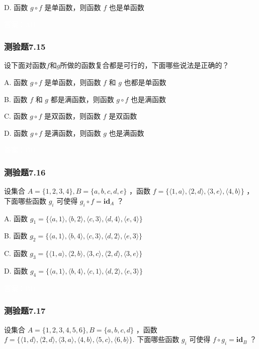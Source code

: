 \documentclass[UTF8, heading=true]{ctexart}
\begin{document}
D.  函数 $g \circ f$ 是单函数，则函数 $f$ 也是单函数

\textcolor{white}{答案：AD}

\subsubsection{测验题7.15}

设下面对函数$f$和$g$所做的函数复合都是可行的，下面哪些说法是正确的？

A. 函数 $g \circ f$ 是单函数，则函数 $f$ 和 $g$ 也都是单函数

B. 函数 $f$ 和 $g$ 都是满函数，则函数 $g \circ f$ 也是满函数

C. 函数 $g \circ f$ 是双函数，则函数 $f$ 是双函数

D. 函数 $g \circ f$ 是满函数，则函数 $g$ 也是满函数

\textcolor{white}{答案：BD}

\subsubsection{测验题7.16}

设集合 $A=\{1,2,3,4\}, B=\{a, b, c, d, e\}$ ，函数 $f=\{\langle 1, a\rangle,\langle 2, d\rangle,\langle 3, e\rangle,\langle 4, b\rangle\}$ ，下面哪些函数 $g_i$ 可使得 $g_i \circ f=\mathbf{i d}_A$ ？

A. 函数 $g_1=\{\langle a, 1\rangle,\langle b, 2\rangle,\langle c, 3\rangle,\langle d, 4\rangle,\langle e, 4\rangle\}$

B. 函数 $g_2=\{\langle a, 1\rangle,\langle b, 4\rangle,\langle c, 3\rangle,\langle d, 2\rangle,\langle e, 3\rangle\}$

C. 
函数 $g_3=\{\langle 1, a\rangle,\langle 2, b\rangle,\langle 3, c\rangle,\langle 2, d\rangle,\langle 3, e\rangle\}$

D.  
函数 $g_4=\{\langle a, 1\rangle,\langle b, 4\rangle,\langle c, 1\rangle,\langle d, 2\rangle,\langle e, 3\rangle\}$


\textcolor{white}{答案：BD}

\subsubsection{测验题7.17}

设集合 $A=\{1,2,3,4,5,6\}, B=\{a, b, c, d\}$ ，函数 $f=\{\langle 1, d\rangle,\langle 2, d\rangle,\langle 3, a\rangle,\langle 4, b\rangle,\langle 5, c\rangle,\langle 6, b\rangle\}$. 下面哪些函数 $g_i$ 可使得 $f \circ g_i=\mathbf{i d}_B$ ？
\end{document}

